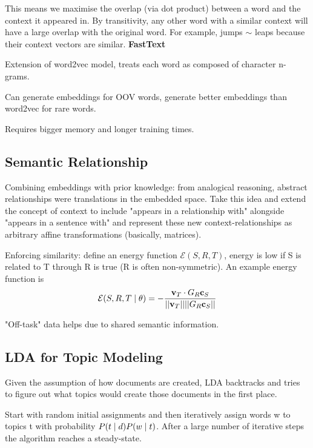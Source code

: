 \documentclass[12pt]{article}
\begin{document}
\item This means we maximise the overlap (via dot product) between a word and the context it appeared in. By transitivity, any other word with a similar context will have a large overlap with the original word. For example, jumps $\sim$ leaps because their context vectors are similar.
\ule
\textbf{FastText}
\ulb
\item Extension of word2vec model, treats each word as composed of character n-grams.
\item Can generate embeddings for OOV words, generate better embeddings than word2vec for rare words.
\item Requires bigger memory and longer training times.
\ule

\subsection{Semantic Relationship}
\par Combining embeddings with prior knowledge: from analogical reasoning, abstract relationships were translations in the embedded space. Take this idea and extend the concept of context to include "appears in a relationship with" alongside "appears in a sentence with" and represent these new context-relationships as arbitrary affine transformations (basically, matrices).
\par Enforcing similarity: define an energy function $\mathcal{E} (S,R,T)$, energy is low if S is related to T through R is true (R is often non-symmetric). An example  energy function is $$\mathcal{E} (S,R,T \mid \theta) = -\frac{\mathbf{v}_T \cdot G_R \mathbf{c}_S}{||\mathbf{v}_T||||G_R \mathbf{c}_S||}$$
\par "Off-task" data helps due to shared semantic information.

\subsection{LDA for Topic Modeling}
\par Given the assumption of how documents are created, LDA backtracks and tries to figure out what topics would create those documents in the first place.
\par Start with random initial assignments and then iteratively assign words w to topics t with probability $P(t \mid d) P(w \mid t)$. After a large number of iterative steps the algorithm reaches a steady-state.
\end{document}
